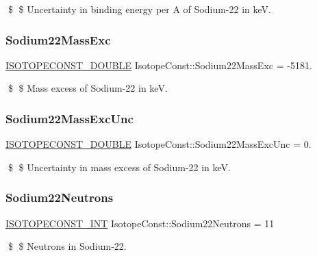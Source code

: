 \$ \$ Uncertainty in binding energy per A of Sodium-\/22 in keV. \mbox{\label{group___isotope_const-_sodium-_na22_ga08e6650c544d8245a89c983c2c97971b}} 
\subsubsection{\texorpdfstring{Sodium22\+Mass\+Exc}{Sodium22MassExc}}
{\footnotesize\ttfamily \mbox{\hyperlink{group___isotope_const-_macros_ga8f45a7272ce02c0b4c65c44636ed719a}{I\+S\+O\+T\+O\+P\+E\+C\+O\+N\+S\+T\+\_\+\+D\+O\+U\+B\+LE}} Isotope\+Const\+::\+Sodium22\+Mass\+Exc = -\/5181.}

\$ \$ Mass excess of Sodium-\/22 in keV. \mbox{\label{group___isotope_const-_sodium-_na22_ga12b1ba99129529450a199d84c13e6c03}} 
\subsubsection{\texorpdfstring{Sodium22\+Mass\+Exc\+Unc}{Sodium22MassExcUnc}}
{\footnotesize\ttfamily \mbox{\hyperlink{group___isotope_const-_macros_ga8f45a7272ce02c0b4c65c44636ed719a}{I\+S\+O\+T\+O\+P\+E\+C\+O\+N\+S\+T\+\_\+\+D\+O\+U\+B\+LE}} Isotope\+Const\+::\+Sodium22\+Mass\+Exc\+Unc = 0.}

\$ \$ Uncertainty in mass excess of Sodium-\/22 in keV. \mbox{\label{group___isotope_const-_sodium-_na22_gaf612ac607ae1994d98a7df074ae18eb5}} 
\subsubsection{\texorpdfstring{Sodium22\+Neutrons}{Sodium22Neutrons}}
{\footnotesize\ttfamily \mbox{\hyperlink{group___isotope_const-_macros_ga5f18360b3e99483a35c32d789e62621c}{I\+S\+O\+T\+O\+P\+E\+C\+O\+N\+S\+T\+\_\+\+I\+NT}} Isotope\+Const\+::\+Sodium22\+Neutrons = 11}

\$ \$ Neutrons in Sodium-\/22. \mbox{\label{group___isotope_const-_sodium-_na22_gab93e7192cd8d5cf84e42be4a84897b66}} 
